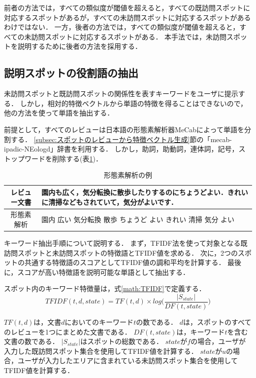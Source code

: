 \documentclass{deimj}
\begin{document}
前者の方法では，すべての類似度が閾値を超えると，すべての既訪問スポットに対応するスポットがあるが，すべての未訪問スポットに対応するスポットがあるわけではない．
一方，後者の方法では，すべての類似度が閾値を超えると，すべての未訪問スポットに対応するスポットがある．
本手法では，未訪問スポットを説明するために後者の方法を採用する．

\subsection{説明スポットの役割語の抽出}
\label{subsec:説明するための役割語の抽出}
未訪問スポットと既訪問スポットの関係性を表すキーワードをユーザに提示する．
しかし，相対的特徴ベクトルから単語の特徴を得ることはできないので，他の方法を使って単語を抽出する．

前提として，すべてのレビューは日本語の形態素解析器MeCabによって単語を分割する．
\ref{subsec:スポットのレビューから特徴ベクトル生成}節の「mecab-ipadic-NEologd」辞書を利用する．
しかし，助詞，助動詞，連体詞，記号，ストップワードを削除する(表\ref{table:mecab})．

\begin{table}[t]
  \caption{形態素解析の例}
  \label{table:mecab}
  \centering
    \begin{tabular}{c|p{}} \hline
      レビュー文書 & 園内も広く，気分転換に散歩したりするのにちょうどよい．きれいに清掃などもされていて，気分がよいです．\\
      \hline
      形態素解析 & 園内 広い 気分転換 散歩 ちょうど よい きれい 清掃 気分 よい\\
      \hline
    \end{tabular}
\end{table}

キーワード抽出手順について説明する．
まず，TFIDF法を使って対象となる既訪問スポットと未訪問スポットの特徴語とTFIDF値を求める．
次に，2つのスポットの共通する特徴語のスコアとしてTFIDF値の調和平均を計算する．
最後に，スコアが高い特徴語を説明可能な単語として抽出する．

スポット内のキーワード特徴量は，式\ref{math:TFIDF}で定義する．
\begin{equation}
  TFIDF(t,d,state) = TF(t,d) \times log\Biggr(\frac{|S_{state}|}{DF(t,state)}\Biggr)
  \label{math:TFIDF}
\end{equation}

$TF(t,d)$は，文書$d$においてのキーワード$t$の数である．
$d$は，スポットのすべてのレビューを1つにまとめた文書である．
$DF(t,state)$は，キーワード$t$を含む文書の数である．
$|S_{state}|$はスポットの総数である．
$state$が$f$の場合，ユーザが入力した既訪問スポット集合を使用してTFIDF値を計算する．
$state$が$u$の場合，ユーザが入力したエリアに含まれている未訪問スポット集合を使用してTFIDF値を計算する．
\end{document}
